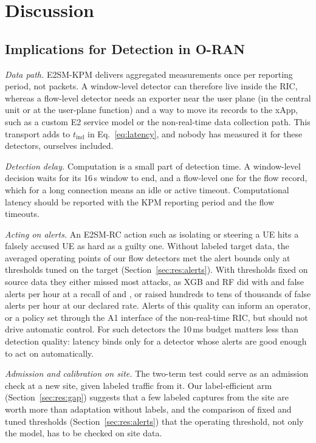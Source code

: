 \section{Discussion}
\label{sec:discussion}

\subsection{Implications for Detection in O-RAN}
\label{sec:disc:practice}

\emph{Data path.} E2SM-KPM delivers aggregated measurements once per reporting period, not packets. A window-level detector can therefore live inside the RIC, whereas a flow-level detector needs an exporter near the user plane (in the central unit or at the user-plane function) and a way to move its records to the xApp, such as a custom E2 service model or the non-real-time data collection path. This transport adds to $t_{\mathrm{ind}}$ in Eq.~\eqref{eq:latency}, and nobody has measured it for these detectors, ourselves included.

\emph{Detection delay.} Computation is a small part of detection time. A window-level decision waits for its 16\,s window to end, and a flow-level one for the flow record, which for a long connection means an idle or active timeout. Computational latency should be reported with the KPM reporting period and the flow timeouts.

\emph{Acting on alerts.} An E2SM-RC action such as isolating or steering a UE hits a falsely accused UE as hard as a guilty one. Without labeled target data, the averaged operating points of our flow detectors met the alert bounds only at thresholds tuned on the target (Section~\ref{sec:res:alerts}). With thresholds fixed on source data they either missed most attacks, as XGB and RF did with \RTestXGBCleanAlerts{} and \RTestRFCleanAlerts{} false alerts per hour at a recall of \RTestXGBCleanRecall{} and \RTestRFCleanRecall{}, or raised hundreds to tens of thousands of false alerts per hour at our declared rate. Alerts of this quality can inform an operator, or a policy set through the A1 interface of the non-real-time RIC, but should not drive automatic control. For such detectors the 10\,ms budget matters less than detection quality: latency binds only for a detector whose alerts are good enough to act on automatically.

\emph{Admission and calibration on site.} The two-term test could serve as an admission check at a new site, given labeled traffic from it. Our label-efficient arm (Section~\ref{sec:res:gap}) suggests that a few labeled captures from the site are worth more than adaptation without labels, and the comparison of fixed and tuned thresholds (Section~\ref{sec:res:alerts}) that the operating threshold, not only the model, has to be checked on site data.

